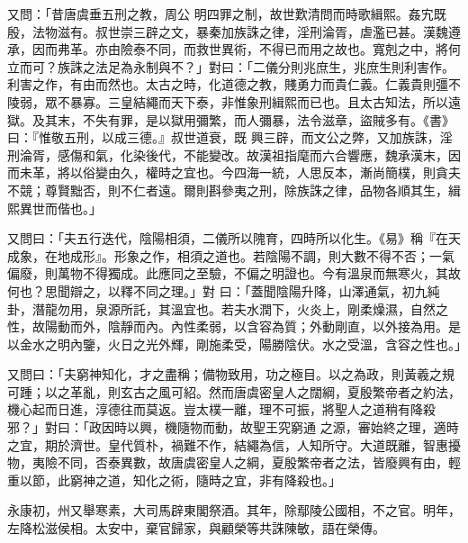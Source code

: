 \begin{pinyinscope}
 又問：「昔唐虞垂五刑之教，周公
 明四罪之制，故世歎清問而時歌緝熙。姦宄既殷，法物滋有。叔世崇三辟之文，暴秦加族誅之律，淫刑淪胥，虐濫已甚。漢魏遵承，因而弗革。亦由險泰不同，而救世異術，不得已而用之故也。寬剋之中，將何立而可？族誅之法足為永制與不？」對曰：「二儀分則兆庶生，兆庶生則利害作。利害之作，有由而然也。太古之時，化道德之教，賤勇力而貴仁義。仁義貴則彊不陵弱，眾不暴寡。三皇結繩而天下泰，非惟象刑緝熙而已也。且太古知法，所以遠獄。及其末，不失有罪，是以獄用彌繁，而人彌暴，法令滋章，盜賊多有。《書》曰：『惟敬五刑，以成三德。』叔世道衰，既
 興三辟，而文公之弊，又加族誅，淫刑淪胥，感傷和氣，化染後代，不能變改。故漢祖指麾而六合響應，魏承漢末，因而未革，將以俗變由久，權時之宜也。今四海一統，人思反本，漸尚簡樸，則貪夫不競；尊賢黜否，則不仁者遠。爾則斟參夷之刑，除族誅之律，品物各順其生，緝熙異世而偕也。」



 又問曰：「夫五行迭代，陰陽相須，二儀所以隗育，四時所以化生。《易》稱『在天成象，在地成形』。形象之作，相須之道也。若陰陽不調，則大數不得不否；一氣偏廢，則萬物不得獨成。此應同之至驗，不偏之明證也。今有溫泉而無寒火，其故何也？思聞辯之，以釋不同之理。」對
 曰：「蓋聞陰陽升降，山澤通氣，初九純卦，潛龍勿用，泉源所託，其溫宜也。若夫水潤下，火炎上，剛柔燥濕，自然之性，故陽動而外，陰靜而內。內性柔弱，以含容為質；外動剛直，以外接為用。是以金水之明內鑒，火日之光外輝，剛施柔受，陽勝陰伏。水之受溫，含容之性也。」



 又問曰：「夫窮神知化，才之盡稱；備物致用，功之極目。以之為政，則黃羲之規可踵；以之革亂，則玄古之風可紹。然而唐虞密皇人之闊綱，夏殷繁帝者之約法，機心起而日進，淳德往而莫返。豈太樸一離，理不可振，將聖人之道稍有降殺邪？」對曰：「政因時以興，機隨物而動，故聖王究窮通
 之源，審始終之理，適時之宜，期於濟世。皇代質朴，禍難不作，結繩為信，人知所守。大道既離，智惠擾物，夷險不同，否泰異數，故唐虞密皇人之綱，夏殷繁帝者之法，皆廢興有由，輕重以節，此窮神之道，知化之術，隨時之宜，非有降殺也。」



 永康初，州又舉寒素，大司馬辟東閣祭酒。其年，除鄢陵公國相，不之官。明年，左降松滋侯相。太安中，棄官歸家，與顧榮等共誅陳敏，語在榮傳。




\end{pinyinscope}

